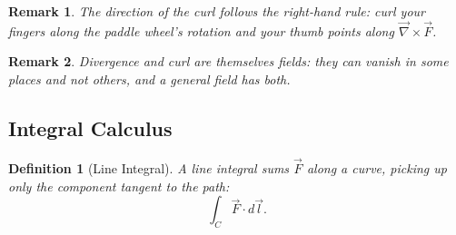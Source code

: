 \documentclass{article}
\newtheorem{definition}{Definition}
\newtheorem{remark}{Remark}
\begin{document}
\begin{remark}
    The direction of the curl follows the right-hand rule: curl your fingers along the paddle wheel's rotation and your thumb points along $\vec{\nabla}\times\vec{F}$.
\end{remark}
\begin{remark}
    Divergence and curl are themselves fields: they can vanish in some places and not others, and a general field has both.
\end{remark}

\subsection{Integral Calculus}
\begin{definition}[Line Integral]
    A line integral sums $\vec{F}$ along a curve, picking up only the component tangent to the path:
    \[\int_C \vec{F}\cdot d\vec{l}.\]
\end{definition}
\end{document}
